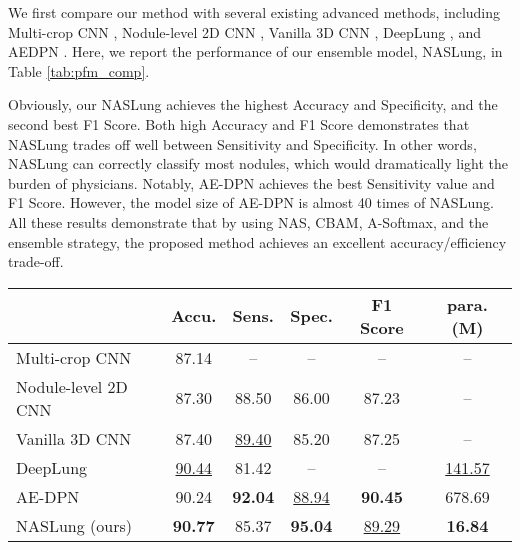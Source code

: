 \documentclass[final,5p,times,twocolumn]{elsarticle}
\begin{document}
We first compare our method with several existing advanced methods, including Multi-crop CNN \citep{shen2017multi}, Nodule-level 2D CNN \citep{yan2016classification}, Vanilla 3D CNN \citep{yan2016classification}, DeepLung \citep{zhu2018deeplung}, and AEDPN \citep{JIANG2019AEDPN}. Here, we report the performance of our ensemble model, NASLung, in Table \ref{tab:pfm_comp}. 

Obviously, our NASLung achieves the highest Accuracy and Specificity, and the second best F1 Score. Both high Accuracy and F1 Score demonstrates that NASLung  trades off well between Sensitivity and Specificity. In other words, NASLung  can correctly classify most nodules, which would dramatically light the burden of physicians. 
Notably, AE-DPN \citep{JIANG2019AEDPN} achieves the best Sensitivity value and F1 Score. However, the model size of AE-DPN is almost 40 times of NASLung. 
All these results demonstrate that by using NAS, CBAM, A-Softmax, and the ensemble strategy, the proposed method achieves an excellent accuracy/efficiency trade-off. 




\begin{table*}
\centering
\caption{Comparison with existing methods across folds 1-5 on the LIDC-IDRI dataset. \textit{Accu.}, \textit{Sens.}, \textit{Spec.}, and \textit{para.} denote \textit{Accuracy}, \textit{Sensitivity}, \textit{Specificity}, and the number of parameters, respectively. The best and second best results in each column are shown in \textbf{boldface} and \underline{underline} format, respectively.}
\small
\label{tab:pfm_comp}
\begin{tabular}{l|ccccc}
\toprule
 			& Accu.	& Sens.	& Spec.	& F1 Score & para. (M)	\\	
\midrule	
Multi-crop CNN \citep{shen2017multi} &  	87.14 	&	--	&	--	&	--	&	--	\\
Nodule-level 2D CNN \citep{yan2016classification} & 	87.30 	&	88.50 	&	86.00	&	87.23 &	--		\\
Vanilla 3D CNN \citep{yan2016classification} & 	87.40 	&	\underline{89.40} 	&	85.20	&	87.25 &	--			\\
DeepLung \citep{zhu2018deeplung} &  	\underline{90.44} 	&	81.42 	&	--	&	--	& \underline{141.57} \\
AE-DPN \citep{JIANG2019AEDPN}  & 	90.24	&	\textbf{92.04}	&	\underline{88.94}	&	\textbf{90.45} & 678.69	\\
\midrule
NASLung (ours) &	\textbf{90.77}	&	85.37 	&	\textbf{95.04} 	&	\underline{89.29} 	&	\textbf{16.84} 	\\
\bottomrule												
\end{tabular}
\end{table*}
\end{document}
